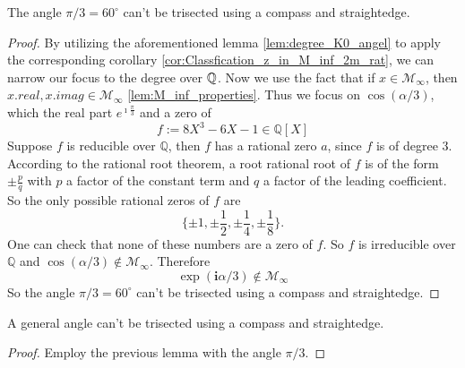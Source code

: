 \begin{lemma}
    \label{lem:pi_third_not_in_M_inf}
    \leanok
    The angle $\pi / 3 = 60^{\circ}$ can't be trisected using a compass and straightedge.
\end{lemma}
\begin{proof}
    \leanok 
    By utilizing the aforementioned lemma \ref{lem:degree_K0_angel} to apply the corresponding corollary \ref{cor:Classfication_z_in_M_inf_2m_rat}, we can narrow our focus to the degree over $\mathbb{Q}$.
    Now we use the fact that if $x\in \mathcal{M}_{\infty}$, then $x.real, x.imag \in \mathcal{M}_{\infty}$ \ref{lem:M_inf_properties}. 
    Thus we focus on $\cos(\alpha/3)$, which the real part $e^{\imath \frac{\pi}{3}}$ and a zero of
    \begin{equation*}
        f := 8 X^3 - 6 X - 1 \in \mathbb{Q}[X]
    \end{equation*}
    Suppose $f$ is reducible over $\mathbb{Q}$, then $f$ has a rational zero $a$, since $f$ is of degree $3$. According to the rational root theorem, a root rational root of $f$ is of the form $\pm \frac{p}{q}$ with $p$ a factor of the constant term and $q$ a factor of the leading coefficient. So the only possible rational zeros of $f$ are
     \begin{equation*}
        \{ \pm 1, \pm \frac{1}{2}, \pm \frac{1}{4}, \pm \frac{1}{8} \}.
     \end{equation*}
     One can check that none of these numbers are a zero of $f$.
     So $f$ is irreducible over $\mathbb{Q}$ and $\cos(\alpha/3) \notin \mathcal{M}_{\infty}$.
     Therefore
        \begin{equation*}
            \exp(\textbf{i} \alpha/3) \notin \mathcal{M}_{\infty}
        \end{equation*}
    So the angle $\pi / 3 = 60^{\circ}$ can't be trisected using a compass and straightedge.
\end{proof}

\begin{theorem}
    \label{thm:Angle_not_Trisectable}
    \leanok
    A general angle can't be trisected using a compass and straightedge.
\end{theorem}
\begin{proof}
    \leanok
    Employ the previous lemma with the angle $\pi / 3$.
\end{proof}